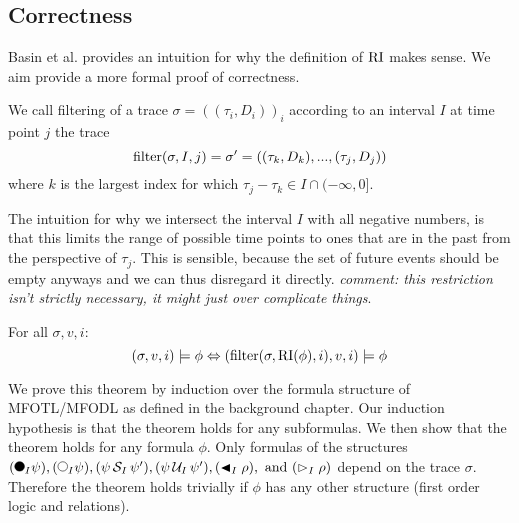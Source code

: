 \subsection{Correctness}
Basin et al. \cite{Basin2016} provides an intuition for why the definition of $\operatorname{RI}$ makes sense.
We aim provide a more formal proof of correctness.
\begin{definition}
    We call filtering of a trace $\sigma=((\tau_i,D_i))_i$ according to an interval $I$ at time point $j$ the trace 
    \begin{equation*}
        \operatorname{filter}(\sigma, I, j) = \sigma' = ((\tau_k,D_k), ..., (\tau_j,D_j))
    \end{equation*}
    where $k$ is the largest index for which $\tau_j - \tau_k \in I \cap (-\infty,0]$.
\end{definition}
The intuition for why we intersect the interval $I$ with all negative numbers, is that this limits the range of possible time points to ones that are in the past from the perspective of $\tau_j$.
This is sensible, because the set of future events should be empty anyways and we can thus disregard it directly.
\textit{comment: this restriction isn't strictly necessary, it might just over complicate things}.
\begin{theorem}
    For all  $\sigma, v, i$:
    \begin{equation*}
        (\sigma, v, i) \models \phi 
        \Leftrightarrow (\operatorname{filter}(\sigma, \operatorname{RI}(\phi), i), v, i) \models \phi
    \end{equation*}
\end{theorem}
We prove this theorem by induction over the formula structure of MFOTL/MFODL as defined in the background chapter.
Our induction hypothesis is that the theorem holds for any subformulas.
We then show that the theorem holds for any formula $\phi$.
Only formulas of the structures $(\Previous{I} \psi),(\Next{I} \psi), (\psi \Since{I} \psi'), (\psi \Until{I} \psi'), (\Pregex{I} \rho), \text{ and } (\Fregex{I} \rho)$ depend on the trace $\sigma$.
Therefore the theorem holds trivially if $\phi$ has any other structure (first order logic and relations).

